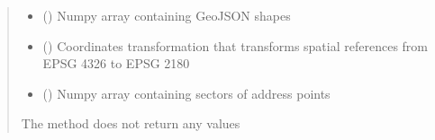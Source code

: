\documentclass[letterpaper,10pt,english]{sphinxmanual}
\begin{document}
\begin{fulllineitems}
\begin{quote}
\begin{description}
\begin{itemize}
\item {} 
\sphinxAtStartPar
{} () \textendash{} Numpy array containing GeoJSON shapes

\item {} 
\sphinxAtStartPar
{} () \textendash{} Coordinates transformation that transforms spatial references from EPSG 4326 to EPSG 2180

\item {} 
\sphinxAtStartPar
{} () \textendash{} Numpy array containing sectors of address points

\end{itemize}

\sphinxAtStartPar
{}

\sphinxAtStartPar
The method does not return any values

\end{description}\end{quote}

\end{fulllineitems}

\end{document}
